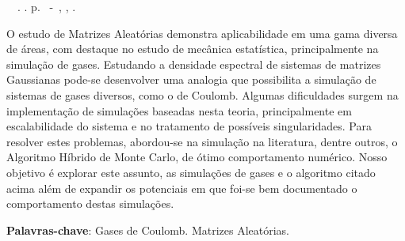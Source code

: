 \setlength{\absparsep}{18pt} %
\begin{resumo}
	\begin{flushleft} 
			\setlength{\absparsep}{0pt} %
			\SingleSpacing 
			\imprimirautorabr~~\textbf{\imprimirtituloresumo}.	\imprimirdata. \pageref{LastPage}p. 
			\imprimirtipotrabalho~-~\imprimirinstituicao, \imprimirlocal, \imprimirdata. 
 	\end{flushleft}
\OnehalfSpacing 	
		
O estudo de Matrizes Aleatórias demonstra aplicabilidade em uma gama diversa de áreas, com destaque no estudo de mecânica estatística, principalmente na simulação de gases. Estudando a densidade espectral de sistemas de matrizes Gaussianas pode-se desenvolver uma analogia que possibilita a simulação de sistemas de gases diversos, como o de Coulomb. Algumas dificuldades surgem na implementação de simulações baseadas nesta teoria, principalmente em escalabilidade do sistema e no tratamento de possíveis singularidades. Para resolver estes problemas, abordou-se na simulação na literatura, dentre outros, o Algoritmo Híbrido de Monte Carlo, de ótimo comportamento numérico. Nosso objetivo é explorar este assunto, as simulações de gases e o algoritmo citado acima além de expandir os potenciais em que foi-se bem documentado o comportamento destas simulações.
 

 \textbf{Palavras-chave}: Gases de Coulomb. Matrizes Aleatórias. 
\end{resumo}